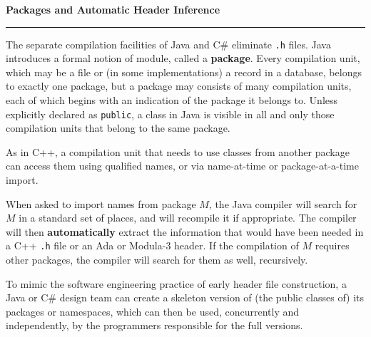 \nopagenumbers
{\bf Packages and Automatic Header Inference}
\vskip 1mm
\hrule

\vskip 6pt
The separate compilation facilities of Java and C$\#$ eliminate {\tt .h} files. Java introduces a formal notion of module, called a {\bf package}. Every compilation unit, which may be a file or (in some implementations) a record in a database, belongs to exactly one package, but a package may consists of many compilation units, each of which  begins with an indication of the package it belongs to. Unless explicitly declared as {\tt public}, a class in Java is visible in all and only those compilation units that belong to the same package.

\vskip 6pt
As in C++, a compilation unit that needs to use classes from another package can access them using qualified names, or via name-at-time or package-at-a-time import.

\vskip 6pt
When asked to import names from package $M$, the Java compiler will search for $M$ in a standard set of places, and will recompile it if appropriate. The compiler will then {\bf automatically} extract the information that would have been needed in a C++ {\tt .h} file or an Ada or Modula-3 header. If the compilation of $M$ requires other packages, the compiler will search for them as well, recursively.

\vskip 6pt
To mimic the software engineering practice of early header file construction, a Java or C$\#$ design team can create a skeleton version of (the public classes of) its packages or namespaces, which can then be used, concurrently and independently, by the programmers responsible for the full versions.

\vfill\eject
\bye
